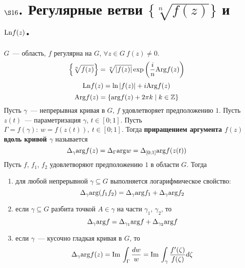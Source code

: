 \section{$\S 16$. Регулярные ветви $\{\sqrt[n]{f(z)}\}$ и $\mathrm{Ln} f(z)$.}
\sug
$G$~--- область, $f$ регулярна на $G$, $\forall z \in G \ f(z) \neq 0$.
\begin{equation}\label{(16.1)}
    \left\{ \sqrt[n]{f(z)} \right\} = \sqrt[n]{\left| f(z) \right|} \exp \left( \frac{i}{n}\mathrm{Arg} f(z) \right)
\end{equation}
\begin{equation}\label{(16.2)}
    \mathrm{Ln} f(z) = \ln \left| f(z) \right| +i \mathrm{Arg} f(z)
\end{equation}
\begin{equation}\label{(16.3)}
    \mathrm{Arg} f(z) = \left\{ \mathrm{arg} f(z) + 2 \pi k \mid k \in \mathbb{Z} \right\}
\end{equation}
\Def
Пусть $\gamma$~--- непрерывная кривая в $G$, $f$ удовлетворяет предположению
$1$. Пусть $z(t)$~--- параметризация $\gamma$, $t \in [0;1]$. Пусть $\Gamma =
f(\gamma): \ w = f(z(t)), \ t \in [0;1]$. Тогда \textbf{приращением аргумента
  $f(z)$ вдоль кривой $\gamma$} называется
\begin{equation}\label{(16.4)}
    \Delta_{\gamma}\mathrm{arg} f(z) = \Delta_\Gamma\mathrm{arg} w = \Delta_{[0;1]}\mathrm{arg} f(z(t))
\end{equation}
\lemma
Пусть $f$, $f_1$, $f_2$ удовлетворяют предположению $1$ в области $G$. Тогда
\begin{enumerate}
    \item для любой непрерывной $\gamma \subseteq G$ выполняется логарифмическое
    свойство:
    \begin{equation}\label{(16.5)}
        \Delta_{\gamma}\mathrm{arg} (f_1f_2) = \Delta_\gamma\mathrm{arg} f_1 + \Delta_{\gamma}\mathrm{arg} f_2
    \end{equation}
    \item если $\gamma \subseteq G$ разбита точкой $A \in \gamma$ на части
    $\gamma_1$, $\gamma_2$, то
    \begin{equation}\label{(16.6)}
        \Delta_{\gamma}\mathrm{arg} f = \Delta_{\gamma_1}\mathrm{arg} f + \Delta_{\gamma_2}\mathrm{arg} f
    \end{equation}
    \item если $\gamma$~--- кусочно гладкая кривая в $G$, то
    \begin{equation}\label{(16.7)}
        \Delta_{\gamma}\mathrm{arg} f(z) = \mathrm{Im}\, \int_\Gamma \frac{dw}{w} = \mathrm{Im}\, \int_{\gamma} \frac{f'(\zeta)}{f(\zeta)}d\zeta
    \end{equation}
\end{enumerate}
